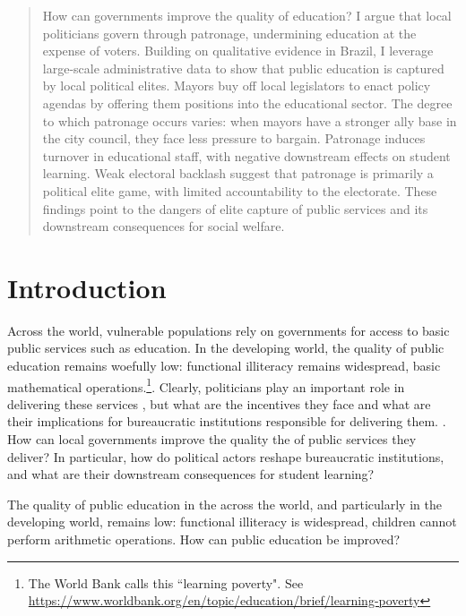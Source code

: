 
\maketitle

\begin{abstract}
    How can governments improve the quality of education? I argue that local politicians govern through patronage, undermining education at the expense of voters. Building on qualitative evidence in Brazil, I leverage large-scale administrative data to show that public education is captured by local political elites. Mayors buy off local legislators to enact policy agendas by offering them positions into the educational sector. The degree to which patronage occurs varies: when mayors have a stronger ally base in the city council, they face less pressure to bargain. Patronage induces turnover in educational staff, with negative downstream effects on student learning. Weak electoral backlash suggest that patronage is primarily a political elite game, with limited accountability to the electorate. These findings point to the dangers of elite capture of public services and its downstream consequences for social welfare.
\end{abstract}

\newpage
\section{Introduction}

Across the world, vulnerable populations rely on governments for access to basic public services such as education. In the developing world, the quality of public education remains woefully low: functional illiteracy remains widespread, basic mathematical operations.\footnote{The World Bank calls this ``learning poverty". See \url{https://www.worldbank.org/en/topic/education/brief/learning-poverty}}. Clearly, politicians play an important role in delivering these services \citep{gulzar_politicians_2017,besley_political_2003}, but what are the incentives they face and what are their implications for bureaucratic institutions responsible for delivering them. \citep{cochrane_policies_1983, falleti_decentralization_2010}. How can local governments improve the quality the of public services they deliver? In particular, how do political actors reshape bureaucratic institutions, and what are their downstream consequences for student learning?

The quality of public education in the across the world, and particularly in the developing world, remains low: functional illiteracy is widespread, children cannot perform arithmetic operations. How can public education be improved? 


